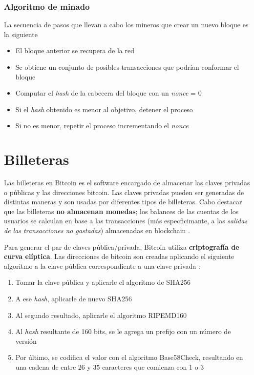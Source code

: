 \subsubsection*{Algoritmo de minado}

La secuencia de pasos que llevan a cabo los mineros que crear un nuevo bloque es la siguiente \autocite{MasteringBlockchainMiningAlgorithm}

\begin{itemize}
    \item El bloque anterior se recupera de la red
    \item Se obtiene un conjunto de posibles transacciones que podrían conformar el bloque
    \item Computar el \emph{hash} de la cabecera del bloque con un \emph{nonce} = 0 
    \item Si el \emph{hash} obtenido es menor al objetivo, detener el proceso
    \item Si no es menor, repetir el proceso incrementando el \emph{nonce} 
\end{itemize}

\section{Billeteras}

Las billeteras en Bitcoin es el software encargado de almacenar las claves privadas o públicas y las direcciones bitcoin. Las claves privadas pueden ser generadas de distintas maneras y son usadas por diferentes tipos de billeteras. Cabo destacar que las billeteras \textbf{no almacenan monedas}; los balances de las cuentas de los usuarios se calculan en base a las transacciones (más especficimante, a las \emph{salidas de las transacciones no gastadas}) almacenadas en blockchain \autocite{MasteringBlockchainWallets}. 

Para generar el par de claves pública/privada, Bitcoin utiliza \textbf{criptografía de curva elíptica}. Las direcciones de bitcoin son creadas aplicando el siguiente algoritmo a la clave pública correspondiente a una clave privada \autocite{MasteringBlockchainKeys}:

\begin{enumerate}
    \item Tomar la clave pública y aplicarle el algoritmo de SHA256
    \item A ese \emph{hash}, aplicarle de nuevo SHA256 
    \item Al segundo resultado, aplicarle el algoritmo RIPEMD160
    \item Al \emph{hash} resultante de 160 bits, se le agrega un prefijo con un número de versión
    \item Por último, se codifica el valor con el algoritmo Base58Check, resultando en una cadena de entre 26 y 35 caracteres que comienza con 1 o 3
\end{enumerate}

